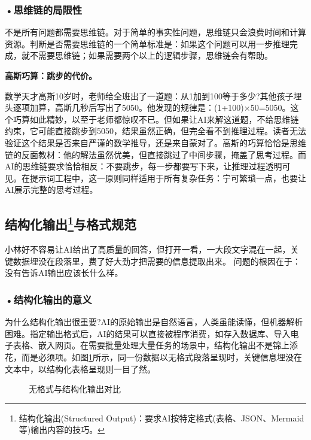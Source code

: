 \subsubsection*{\textbf{•思维链的局限性}}


不是所有问题都需要思维链。对于简单的事实性问题，思维链只会浪费时间和计算资源。判断是否需要思维链的一个简单标准是：如果这个问题可以用一步推理完成，就不需要思维链；如果需要两个以上的逻辑步骤，思维链会有帮助。

\begin{funbox}
\textbf{高斯巧算：跳步的代价。} 

数学天才高斯10岁时，老师给全班出了一道题：从1加到100等于多少?其他孩子埋头逐项加算，高斯几秒后写出了5050。他发现的规律是：(1+100)×50=5050。这个巧算如此精妙，以至于老师都惊叹不已。但如果让AI来解这道题，不给思维链约束，它可能直接跳步到5050，结果虽然正确，但完全看不到推理过程。读者无法验证这个结果是否来自严谨的数学推导，还是来自蒙对了。高斯的巧算恰恰是思维链的反面教材：他的解法虽然优美，但直接跳过了中间步骤，掩盖了思考过程。而AI的思维链要求恰恰相反：不要跳步，每一步都要写下来，让推理过程透明可见。在提示词工程中，这一原则同样适用于所有复杂任务：宁可繁琐一点，也要让AI展示完整的思考过程。
\end{funbox}

\subsection[结构化输出与格式规范]{\textbf{结构化输出}\footnote{结构化输出(Structured Output)：要求AI按特定格式(表格、JSON、Mermaid等)输出内容的技巧。}与格式规范}

小林好不容易让AI给出了高质量的回答，但打开一看，一大段文字混在一起，关键数据埋没在段落里，费了好大劲才把需要的信息提取出来。
问题的根因在于：没有告诉AI输出应该长什么样。 

\subsubsection*{\textbf{•结构化输出的意义}}


为什么结构化输出很重要?AI的原始输出是自然语言，人类虽能读懂，但机器解析困难。指定输出格式后，AI的结果可以直接被程序消费，如存入数据库、导入电子表格、嵌入网页。在需要批量处理大量任务的场景中，结构化输出不是锦上添花，而是必须项。如图\ref{fig:ch3_3_10}所示，同一份数据以无格式段落呈现时，关键信息埋没在文本中，以结构化表格呈现则一目了然。

\begin{figure}[H]
\centering
{}
\caption{无格式与结构化输出对比}
\label{fig:ch3_3_10}
\end{figure}

